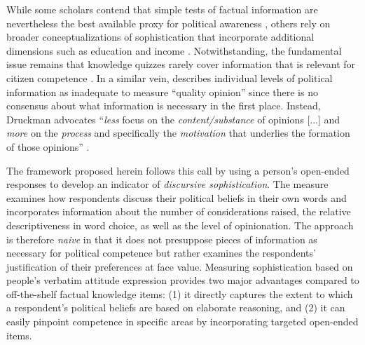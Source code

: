 While some scholars contend that simple tests of factual information are nevertheless the best available proxy for political awareness \citep[e.g.,][]{zaller1990political}, others rely on broader conceptualizations of sophistication that incorporate additional dimensions such as education and income \citep[e.g.,][]{jacoby2006value}. Notwithstanding, the fundamental issue remains that knowledge quizzes rarely cover information that is relevant for citizen competence \citep{lupia2006elitism}. In a similar vein, \citet{druckman2014pathologies} describes individual levels of political information as inadequate to measure ``quality opinion'' since there is no consensus about what information is necessary in the first place. Instead, Druckman advocates ``\textit{less} focus on the \textit{content/substance} of opinions [...] and \textit{more} on the \textit{process} and specifically the \textit{motivation} that underlies the formation of those opinions'' \citeyearpar[478, emphasis in the original]{druckman2014pathologies}. 

The framework proposed herein follows this call by using a person's open-ended responses to develop an indicator of \textit{discursive sophistication}. The measure examines how respondents discuss their political beliefs in their own words and incorporates information about the number of considerations raised, the relative descriptiveness in word choice, as well as the level of opinionation. The approach is therefore \textit{naive} in that it does not presuppose pieces of information as necessary for political competence but rather examines the respondents' justification of their preferences at face value. Measuring sophistication based on people's verbatim attitude expression provides two major advantages compared to off-the-shelf factual knowledge items: (1) it directly captures the extent to which a respondent's political beliefs are based on elaborate reasoning, and (2) it can easily pinpoint competence in specific areas by incorporating targeted open-ended items.

